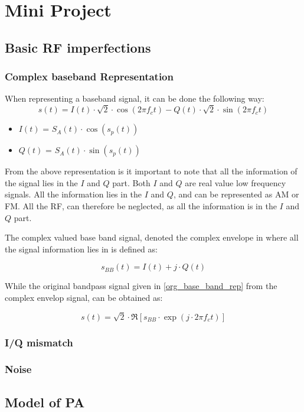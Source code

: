 \chapter{Mini Project}


\section{Basic RF imperfections}

\subsection{Complex baseband Representation}
When representing a  baseband signal, it can be done the following way:
\begin{equation}
s(t) = I(t) \cdot \sqrt{2} \cdot \cos(2 \pi f_{c}t)-Q(t)\cdot \sqrt{2} \cdot \sin(2 \pi f_{c}t)
\label{org_base_band_rep} 
\end{equation}

\begin{itemize}
\item $I(t)$ = $S_{A}(t) \cdot \cos(s_{p}(t))$
\item $Q(t)$ = $S_{A}(t) \cdot \sin(s_{p}(t))$
\end{itemize}

From the above representation is it important to note that all the information of the signal lies in the $I$ and $Q$ part. Both $I$ and $Q$ are real value low frequency signals. All the information lies in the $I$ and $Q$, and can be represented as AM or FM. All the RF, can therefore be neglected, as all the information is in the $I$ and $Q$ part. 

The complex valued base band signal, denoted the complex envelope in where all the signal information lies in is defined as:

\begin{equation}
s_{BB}(t) = I(t) + j\cdot Q(t)
\label{com_base} 
\end{equation}

While the original bandpass signal given in \eqref{org_base_band_rep} from the complex envelop signal, can be obtained as:

\begin{equation}
s(t) = \sqrt{2} \cdot \Re[s_{BB} \cdot \exp(j\cdot 2\pi f_{c}t)]
\label{com_bas_to_org_bas}
\end{equation}


\subsection{I/Q mismatch}


\subsection{Noise}


\section{Model of PA}



